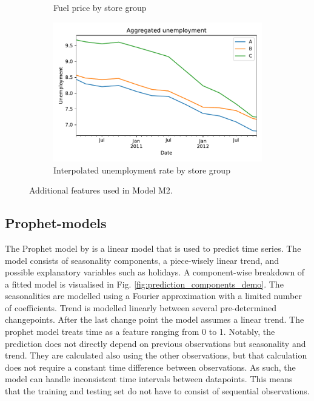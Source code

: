 \documentclass[english, 12pt, a4paper, sci, utf8, a-1b, online]{aaltothesis}
\begin{document}
\begin{figure}[htb]
\begin{subfigure}[b]{0.5\textwidth}
		\caption{Fuel price by store group}
		\label{fig:data_fuel}
	\end{subfigure}
	\hfill
	\begin{subfigure}[b]{0.5\textwidth}
		\centering
		\includegraphics[width=\textwidth]{../plots/dataset/dataset_plot_unemployment_interpolated.pdf}
		\caption{Interpolated unemployment rate by store group}
		\label{fig:data_unemp}
	\end{subfigure}
	\caption{\label{fig:regressors} Additional features used in Model M2.}
\end{figure}


\subsection{Prophet-models}

The Prophet model by \cite{Prophet} is a linear model that is used to predict time series. The model consists of seasonality components, a piece-wisely linear trend, and possible explanatory variables such as holidays. A component-wise breakdown of a fitted model is visualised in Fig. \ref{fig:prediction_components_demo}. The seasonalities are modelled using a Fourier approximation with a limited number of coefficients. Trend is modelled linearly between several pre-determined changepoints. After the last change point the model assumes a linear trend. The prophet model treats time as a feature ranging from 0 to 1. Notably, the prediction does not directly depend on previous observations but seasonality and trend. They are calculated also using the other observations, but that calculation does not require a constant time difference between observations. As such, the model can handle inconsistent time intervals between datapoints. This means that the training and testing set do not have to consist of sequential observations.
\end{document}

